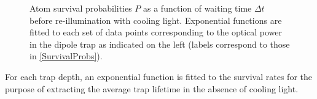 \documentclass[../Thesis-IJspeert.tex]{subfiles}
\begin{document}
\begin{figure}[t!]
\begin{minipage}[c]{0.70\textwidth}
	\end{minipage}
	\caption[Atom survival probabilities as a function of waiting time before re-illumination with cooling light]{Atom survival probabilities $P$ as a function of waiting time $\Delta t$ before re-illumination with cooling light. Exponential functions are fitted to each set of data points corresponding to the optical power in the dipole trap as indicated on the left (labels correspond to those in \autoref{SurvivalProbs}).} 
	\label{SurvivalProbs2} 
\end{figure}
For each trap depth, an exponential function is fitted to the survival rates for the purpose of extracting the average trap lifetime in the absence of cooling light.
\end{document}
